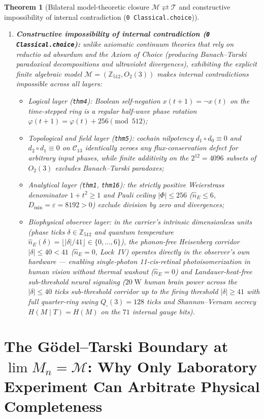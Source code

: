 \documentclass[11pt,a4paper]{article}
\newtheorem{theorem}{Theorem}[section]
\theoremstyle{definition}
\theoremstyle{remark}
\begin{document}
\begin{theorem}[Bilateral model-theoretic closure $\mathcal{M} \rightleftarrows \mathcal{T}$ and constructive impossibility of internal contradiction (\texttt{0 Classical.choice})]
\begin{enumerate}[label=\textbf{(\roman*)},leftmargin=*]
\item \textbf{Constructive impossibility of internal contradiction (\texttt{0 Classical.choice}):}
  unlike axiomatic continuum theories that rely on \emph{reductio ad absurdum} and the Axiom of Choice (producing Banach--Tarski paradoxical decompositions and ultraviolet divergences), exhibiting the explicit finite algebraic model $\mathcal{M} = (\mathbb{Z}_{512}, O_2(3))$ makes internal contradictions impossible across all layers:
  \begin{itemize}[noitemsep]
  \item \emph{Logical layer (\texttt{thm4}):} Boolean self-negation $x(t+1) = \neg x(t)$ on the time-stepped ring is a regular half-wave phase rotation $\varphi(t+1) = \varphi(t) + 256\pmod{512}$;
  \item \emph{Topological and field layer (\texttt{thm5}):} cochain nilpotency $d_1\circ d_0\equiv 0$ and $d_2\circ d_1\equiv 0$ on $\mathcal{C}_{13}$ identically zeroes any flux-conservation defect for arbitrary input phases, while finite additivity on the $2^{12}=4096$ subsets of $O_2(3)$ excludes Banach--Tarski paradoxes;
  \item \emph{Analytical layer (\texttt{thm1}, \texttt{thm16}):} the strictly positive Weierstrass denominator $1+t^2\ge 1$ and Pauli ceiling $|\Phi|\le 256$ ($\hat{n}_E\le 6$, $D_{\min}=\varepsilon=8192>0$) exclude division by zero and divergences;
  \item \emph{Biophysical observer layer:} in the carrier's intrinsic dimensionless units (phase ticks $\delta\in\mathbb{Z}_{512}$ and quantum temperature $\hat{n}_E(\delta) = \lfloor|\delta|/41\rfloor\in\{0,\dots,6\}$), the phonon-free Heisenberg corridor $|\delta|\le 40 < 41$ ($\hat{n}_E=0$, Lock~IV) operates directly in the observer's own hardware --- enabling single-photon 11-\emph{cis}-retinal photoisomerization in human vision without thermal washout ($\hat{n}_E=0$) and Landauer-heat-free sub-threshold neural signaling ($20\;\text{W}$ human brain power across the $|\delta|\le 40$ ticks sub-threshold corridor up to the firing threshold $|\delta|\ge 41$ with full quarter-ring swing $Q_\square(3)=128$ ticks and Shannon--Vernam secrecy $H(M\mid T)=H(M)$ on the $71$ internal gauge bits).
  \end{itemize}
\end{enumerate}
\end{theorem}

\section{The G\"odel--Tarski Boundary at $\lim M_n = \mathcal{M}$: Why Only Laboratory Experiment Can Arbitrate Physical Completeness}
\label{sec:godel-tarski}
\end{document}
